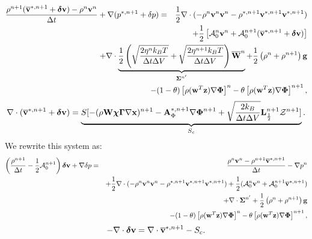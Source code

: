 \documentclass[final]{siamltex}
\def\Ab {{\bf A}}
\def\gb {{\bf g}}
\def\Lb {{\bf L}}
\def\vb {{\bf v}}
\def\wb {{\bf w}}
\def\Wb {{\bf W}}
\def\xb {{\bf x}}
\def\zb {{\bf z}}
\def\chib   {\boldsymbol{\chi}}
\def\deltab {\boldsymbol{\delta}}
\def\Gammab {\boldsymbol{\Gamma}}
\def\Phib   {\boldsymbol{\Phi}}
\def\Sigmab {\boldsymbol{\Sigma}}
\def\half   {\frac{1}{2}}
\begin{document}
{\begin{eqnarray}
\frac{\rho^{n+1}(\overline\vb^{*,n+1} + \deltab\vb) - \rho^n\vb^n}{\Delta t} + \nabla(p^{*,n+1}+\delta p) &=& \half\nabla\cdot(-\rho^n\vb^n\vb^n - \rho^{*,n+1}\vb^{*,n+1}\vb^{*,n+1})\nonumber\\
&&\hspace{-1.5in}+ \half\left[\mathcal{A}_0^n\vb^n + \mathcal{A}_0^{n+1}(\overline\vb^{*,n+1} + \deltab\vb)\right]\nonumber\\
&&\hspace{-1.5in}+ \nabla\cdot\underbrace{\half\left(\sqrt{\frac{2\eta^n k_B T}{\Delta t\Delta V}} + \sqrt{\frac{2\eta^{n+1} k_B T}{\Delta t\Delta V}}\right)\overline\Wb^n}_{\Sigmab^{n'}} + \half\left(\rho^n+\rho^{n+1}\right)\gb\nonumber\\
&&\hspace{-1.5in} - (1-\theta)\left[\rho(\wb^T\zb)\nabla\Phib\right]^n - \theta\left[\rho(\wb^T\zb)\nabla\Phib\right]^{n+1},
\end{eqnarray}
\begin{equation}
\nabla\cdot(\overline\vb^{*,n+1} + \deltab\vb) =  \underbrace{S[-(\rho\Wb\chib\Gammab\nabla\xb)^{n+1} - \Ab_\Phi^{*,n+1}\nabla\Phib^{n+1} + \sqrt{\frac{2k_B}{\Delta t\Delta V}}\Lb_\half^{n+1}\mathcal{Z}^{n+1}]}_{S_c}.
\end{equation}
We rewrite this system as:
\begin{eqnarray}
\left(\frac{\rho^{n+1}}{\Delta t} - \half\mathcal{A}_0^{n+1}\right)\deltab\vb + \nabla\delta p &=& \frac{\rho^n\vb^n-\rho^{n+1}\overline\vb^{*,n+1}}{\Delta t} -\nabla p^n\nonumber\\
&&+ \half\nabla\cdot(-\rho^n\vb^n\vb^n - \rho^{*,n+1}\vb^{*,n+1}\vb^{*,n+1}) + \half(\mathcal{A}_0^n\vb^n + \mathcal{A}_0^{n+1}\overline\vb^{*,n+1} )\nonumber\\
&&+ \nabla\cdot\Sigmab^{n'} + \half\left(\rho^n+\rho^{n+1}\right)\gb\nonumber\\
&&- (1-\theta)\left[\rho(\wb^T\zb)\nabla\Phib\right]^n - \theta\left[\rho(\wb^T\zb)\nabla\Phib\right]^{n+1},
\end{eqnarray}
\begin{equation}
-\nabla\cdot\deltab\vb = \nabla\cdot\overline\vb^{*,n+1} - S_c.
\end{equation}
} %



\end{document}
